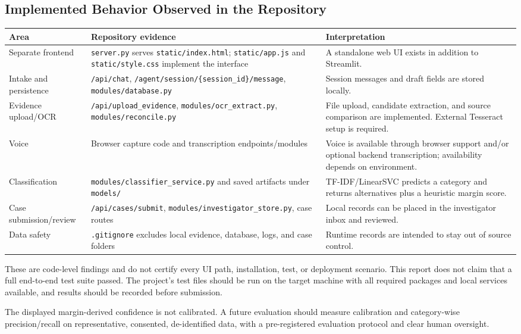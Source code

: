 \documentclass[12pt,a4paper,oneside]{report}
\begin{document}
\subsection{Implemented Behavior Observed in the Repository}
\begin{longtable}{|>{\RaggedRight\arraybackslash}p{}|>{\RaggedRight\arraybackslash}p{}|>{\RaggedRight\arraybackslash}p{}|}
\hline
\textbf{Area} & \textbf{Repository evidence} & \textbf{Interpretation} \\\hline
Separate frontend & \texttt{server.py} serves \texttt{static/index.html}; \texttt{static/app.js} and \texttt{static/style.css} implement the interface & A standalone web UI exists in addition to Streamlit. \\\hline
Intake and persistence & \texttt{/api/chat}, \texttt{/agent/session/\{session\_id\}/message}, \texttt{modules/database.py} & Session messages and draft fields are stored locally. \\\hline
Evidence upload/OCR & \texttt{/api/upload\_evidence}, \texttt{modules/ocr\_extract.py}, \texttt{modules/reconcile.py} & File upload, candidate extraction, and source comparison are implemented. External Tesseract setup is required. \\\hline
Voice & Browser capture code and transcription endpoints/modules & Voice is available through browser support and/or optional backend transcription; availability depends on environment. \\\hline
Classification & \texttt{modules/classifier\_service.py} and saved artifacts under \texttt{models/} & TF-IDF/LinearSVC predicts a category and returns alternatives plus a heuristic margin score. \\\hline
Case submission/review & \texttt{/api/cases/submit}, \texttt{modules/investigator\_store.py}, case routes & Local records can be placed in the investigator inbox and reviewed. \\\hline
Data safety & \texttt{.gitignore} excludes local evidence, database, logs, and case folders & Runtime records are intended to stay out of source control. \\\hline
\end{longtable}
\vspace{2mm}
These are code-level findings and do not certify every UI path, installation, test, or deployment scenario. This report does not claim that a full end-to-end test suite passed. The project's test files should be run on the target machine with all required packages and local services available, and results should be recorded before submission.\par\medskip
The displayed margin-derived confidence is not calibrated. A future evaluation should measure calibration and category-wise precision/recall on representative, consented, de-identified data, with a pre-registered evaluation protocol and clear human oversight.\par\medskip
\end{document}

